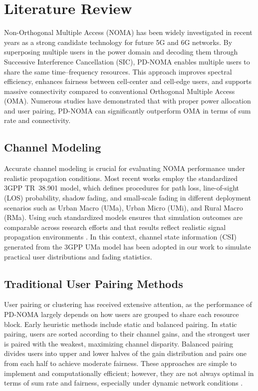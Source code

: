 \section{Literature Review}

Non-Orthogonal Multiple Access (NOMA) has been widely investigated in recent years as a strong candidate technology for future 5G and 6G networks. By superposing multiple users in the power domain and decoding them through Successive Interference Cancellation (SIC), PD-NOMA enables multiple users to share the same time–frequency resources. This approach improves spectral efficiency, enhances fairness between cell-center and cell-edge users, and supports massive connectivity compared to conventional Orthogonal Multiple Access (OMA). Numerous studies have demonstrated that with proper power allocation and user pairing, PD-NOMA can significantly outperform OMA in terms of sum rate and connectivity.

\subsection{Channel Modeling}

Accurate channel modeling is crucial for evaluating NOMA performance under realistic propagation conditions. Most recent works employ the standardized 3GPP TR~38.901 model, which defines procedures for path loss, line-of-sight (LOS) probability, shadow fading, and small-scale fading in different deployment scenarios such as Urban Macro (UMa), Urban Micro (UMi), and Rural Macro (RMa). Using such standardized models ensures that simulation outcomes are comparable across research efforts and that results reflect realistic signal propagation environments \cite{3gpp38901}. In this context, channel state information (CSI) generated from the 3GPP UMa model has been adopted in our work to simulate practical user distributions and fading statistics.

\subsection{Traditional User Pairing Methods}

User pairing or clustering has received extensive attention, as the performance of PD-NOMA largely depends on how users are grouped to share each resource block. Early heuristic methods include static and balanced pairing. In static pairing, users are sorted according to their channel gains, and the strongest user is paired with the weakest, maximizing channel disparity. Balanced pairing divides users into upper and lower halves of the gain distribution and pairs one from each half to achieve moderate fairness. These approaches are simple to implement and computationally efficient; however, they are not always optimal in terms of sum rate and fairness, especially under dynamic network conditions \cite{islam2016,su2017}.

